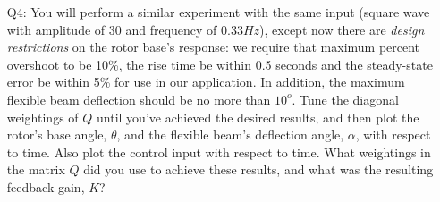 \begin{enumerate}
    \item[Q4:] You will perform a similar experiment with the same input (square wave with amplitude of 30 and frequency of 0.33$Hz$), except now there are \emph{design restrictions} on the rotor base's response: we require that maximum percent overshoot to be 10\%, the rise time be within 0.5 seconds and the steady-state error be within 5\% for use in our application. In addition, the maximum flexible beam deflection should be no more than \(10^o\). Tune the diagonal weightings of $Q$ until you've achieved the desired results, and then plot the rotor's base angle, $\theta$, and the flexible beam's deflection angle, $\alpha$, with respect to time. Also plot the control input with respect to time. What weightings in the matrix $Q$ did you use to achieve these results, and what was the resulting feedback gain, $K$?\\
\end{enumerate}
